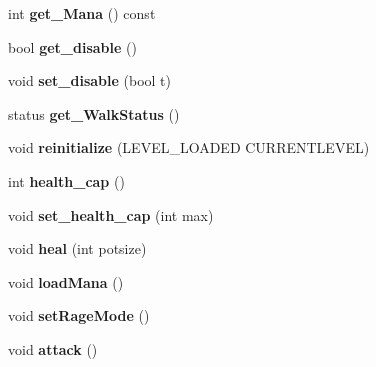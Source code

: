 \begin{DoxyCompactItemize}
\item 
\hypertarget{class_player_a352a8894a05f649fb236ae99cd9da3e9}{int {\bfseries get\-\_\-\-Mana} () const }\label{class_player_a352a8894a05f649fb236ae99cd9da3e9}

\item 
\hypertarget{class_player_a20ab0b8731172d9b39989b1700ebd47d}{bool {\bfseries get\-\_\-disable} ()}\label{class_player_a20ab0b8731172d9b39989b1700ebd47d}

\item 
\hypertarget{class_player_add9dfdb430f9e78178e43a8bf78fa7a3}{void {\bfseries set\-\_\-disable} (bool t)}\label{class_player_add9dfdb430f9e78178e43a8bf78fa7a3}

\item 
\hypertarget{class_player_ae2b606a4cc6b7f3f1147c117fbfa82ce}{status {\bfseries get\-\_\-\-Walk\-Status} ()}\label{class_player_ae2b606a4cc6b7f3f1147c117fbfa82ce}

\item 
\hypertarget{class_player_a5f3457c6aaf834b83d35d9085b46e31d}{void {\bfseries reinitialize} (L\-E\-V\-E\-L\-\_\-\-L\-O\-A\-D\-E\-D C\-U\-R\-R\-E\-N\-T\-L\-E\-V\-E\-L)}\label{class_player_a5f3457c6aaf834b83d35d9085b46e31d}

\item 
\hypertarget{class_player_a6d09b9e7f5e5bcc1bae2d6134c22bf81}{int {\bfseries health\-\_\-cap} ()}\label{class_player_a6d09b9e7f5e5bcc1bae2d6134c22bf81}

\item 
\hypertarget{class_player_ab321d07e6272a7a7168bf411eed105c0}{void {\bfseries set\-\_\-health\-\_\-cap} (int max)}\label{class_player_ab321d07e6272a7a7168bf411eed105c0}

\item 
\hypertarget{class_player_a82c2af081cd2891be248459b4015be56}{void {\bfseries heal} (int potsize)}\label{class_player_a82c2af081cd2891be248459b4015be56}

\item 
\hypertarget{class_player_ae06fc7fdd0493e8c13c0441b49b66777}{void {\bfseries load\-Mana} ()}\label{class_player_ae06fc7fdd0493e8c13c0441b49b66777}

\item 
\hypertarget{class_player_a500a169debe3d89456f57e4c13fef28d}{void {\bfseries set\-Rage\-Mode} ()}\label{class_player_a500a169debe3d89456f57e4c13fef28d}

\item 
\hypertarget{class_player_aeea45f839f224a5320dfadfd2ff3ebe9}{void {\bfseries attack} ()}\label{class_player_aeea45f839f224a5320dfadfd2ff3ebe9}


\end{DoxyCompactItemize}

